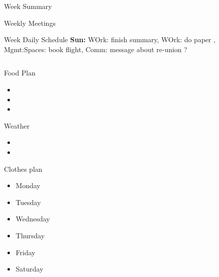\documentclass[serif, mathserif, final]{beamer}
\begin{document}
\begin{frame}
\begin{columns}
\begin{column}{0.5\linewidth}
\begin{block}{Week Summary}
\begin{block}{Weekly Meetings}
\end{block} 
      
      \begin{block}{Week Daily Schedule} 
        {\bf Sun:} WOrk: finish summary,   WOrk: do paper ,
        Mgmt:Spaces: book flight, Comm: message about re-union ? 
      \end{block} 
      
      \begin{column}{0.25\linewidth}
        
        \begin{block}{Food Plan} 
          \begin{itemize}
            \tiny \item \tiny 
          \item \tiny 
          \item \tiny 
          \end{itemize}
        \end{block} 
        
        \begin{block}{Weather}
          \begin{itemize}
            \tiny \item \tiny 
          \item \tiny
          \end{itemize}
        \end{block} 

      \begin{block}{Clothes plan} 
        \begin{itemize}
          \tiny \item \tiny Monday
        \item \tiny Tuesday
        \item \tiny Wednesday
        \item \tiny Thursday
        \item \tiny Friday
          \item \tiny Saturday
        \end{itemize} 
      \end{block}



\end{column}
\end{block}
\end{column}
\end{columns}
\end{frame}
\end{document}
